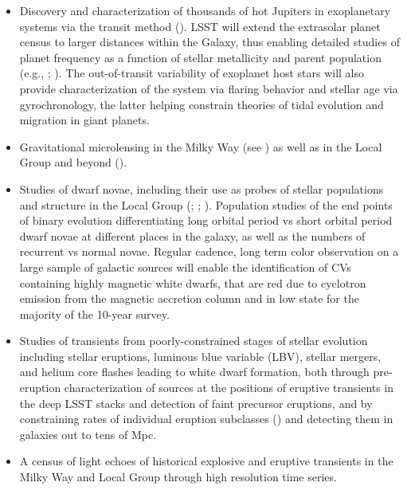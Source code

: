 \begin{itemize}


\item Discovery and characterization of thousands of hot Jupiters
  in exoplanetary systems via the transit method (\cite{Wright2012}).
LSST will extend the extrasolar planet census to larger distances within the Galaxy, thus enabling detailed studies
of planet frequency as a function of stellar metallicity and parent population (e.g., \cite{Hartman2009}; \cite{Bayliss2011}).
The out-of-transit variability of exoplanet host stars will also provide characterization of the system
via flaring behavior and stellar age via gyrochronology, the latter helping constrain theories of tidal evolution and
migration in giant planets.

\item Gravitational microlensing in the Milky Way (see \cite{Han2008}) as well as in the Local Group and beyond (\cite{deJong2008}).

\item Studies of dwarf novae, including their use as probes of stellar populations and
      structure in the Local Group (\cite{Neill2005}; \cite{Shara2006}; \cite{Shen2009}). Population studies of the end points of binary evolution differentiating long orbital period vs short orbital period dwarf novae at different places in the galaxy, as well as the numbers of recurrent vs normal novae. Regular cadence, long term color observation on a large sample of galactic sources will enable the identification of CVs containing highly magnetic white dwarfs, that are red due to cyclotron emission from the magnetic accretion column and in low state for the majority of the 10-year survey.

\item Studies of  transients from poorly-constrained stages of stellar evolution including
stellar eruptions,  luminous blue variable (LBV), stellar mergers, and helium core flashes leading to white dwarf formation,  both through pre-eruption characterization of sources at the positions of eruptive transients in the deep LSST stacks and detection of faint precursor eruptions, and by constraining rates of individual eruption subclasses (\cite{Smith2014}) and detecting them in galaxies out to tens of Mpc.

\item A census of light echoes of historical explosive and eruptive
  transients in the Milky Way and Local Group through high resolution
  time series.


\end{itemize}
